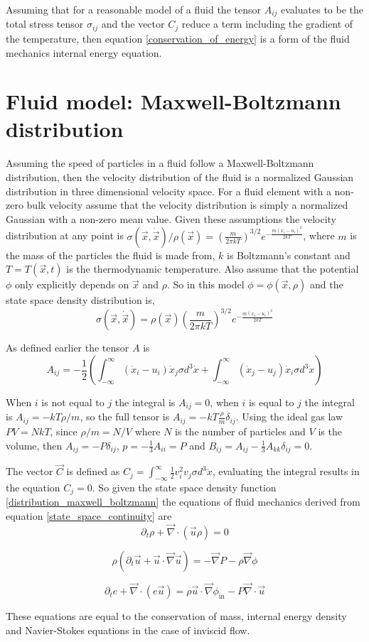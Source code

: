 \documentclass[%
 reprint,
 amsmath,amssymb,
 aps,
]{revtex4-1}
\newcommand{\dvec}[1]{\dot{\vec{#1}}}
\newcommand{\grad}{\vec{\nabla}}
\newcommand{\intVdot}[1]{\int_{-\infty}^{\infty} #1 d^3\dot{x}}
\begin{document}
Assuming that for a reasonable model of a fluid the tensor $A_{ij}$ evaluates to be the total stress tensor $\sigma_{ij}$ and the vector $C_j$ reduce a term including the gradient of the temperature, then equation \eqref{conservation_of_energy} is a form of the fluid mechanics internal energy equation.
\linebreak %

\section{Fluid model: Maxwell-Boltzmann distribution}
Assuming the speed of particles in a fluid follow a Maxwell-Boltzmann distribution, then the velocity distribution of the fluid is a normalized Gaussian distribution in three dimensional velocity space. For a fluid element with a non-zero bulk velocity assume that the velocity distribution is simply a normalized Gaussian with a non-zero mean value. Given these assumptions the velocity distribution at any point is $\sigma(\vec{x}, \dvec{x}) / \rho(\vec{x}) = \left(\frac{m}{2\pi kT}\right)^{3/2}e^{-\frac{m\left(x_i - u_i\right)^2}{2kT}}$, where $m$ is the mass of the particles the fluid is made from, $k$ is Boltzmann's constant and $T=T(\vec{x}, t)$ is the thermodynamic temperature. Also assume that the potential $\phi$ only explicitly depends on $\vec{x}$ and $\rho$. So in this model $\phi=\phi(\vec{x}, \rho)$ and the state space density distribution is,
\begin{equation}
\sigma(\vec{x}, \dvec{x}) = \rho(\vec{x})\left(\frac{m}{2\pi kT}\right)^{3/2}e^{-\frac{m\left(x_i - u_i\right)^2}{2kT}}
\label{distribution_maxwell_boltzmann}
\end{equation}

As defined earlier the tensor $A$ is
\[
A_{ij} = -\frac{1}{2}\left(\intVdot{\left(\dot{x}_i - u_i\right)\dot{x}_j\sigma} + \intVdot{\left(\dot{x}_j - u_j\right)\dot{x}_i\sigma}\right)
\]

When $i$ is not equal to $j$ the integral is $A_{ij} = 0$, when $i$ is equal to $j$ the integral is $A_{ij} = -kT\rho/m$, so the full tensor is $A_{ij}=-kT\frac{\rho}{m}\delta_{ij}$. Using the ideal gas law $PV=NkT$, since $\rho/m=N/V$ where $N$ is the number of particles and $V$ is the volume, then $A_{ij} = -P\delta_{ij}$, $p=-\frac{1}{3}A_{ii}=P$ and $B_{ij}=A_{ij}-\frac{1}{3}A_{kk}\delta_{ij} = 0$.

The vector $\vec{C}$ is defined as $C_j = \intVdot{\frac{1}{2}v_i^2 v_j\sigma}$, evaluating the integral results in the equation $C_j = 0$. So given the state space density function \eqref{distribution_maxwell_boltzmann} the equations of fluid mechanics derived from equation \eqref{state_space_continuity} are
\[
\partial_t\rho + \grad\cdot\left(\vec{u}\rho\right)=0
\]

\[
\rho\left(\partial_t \vec{u} + \vec{u}\cdot\grad\vec{u}\right) = - \grad P - \rho\grad\phi
\]

\[
\partial_te + \grad\cdot\left(e \vec{u}\right) = \rho\vec{u}\cdot\grad\phi_{\text{in}} - P\grad\cdot\vec{u}
\]

These equations are equal to the conservation of mass, internal energy density and Navier-Stokes equations in the case of inviscid flow.
\end{document}
